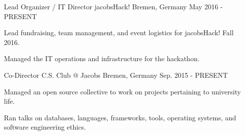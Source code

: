 

\begin{cventries}
  \cventry
    {Lead Organizer / IT Director} %
    {jacobsHack!} %
    {Bremen, Germany} %
    {May 2016 - PRESENT} %
    {
      \begin{cvitems} %
        \item {Lead fundraising, team management, and event logistics for jacobsHack! Fall 2016.}
        \item {Managed the IT operations and infrastructure for the hackathon.}
      \end{cvitems}
    }
  \cventry
    {Co-Director} %
    {C.S. Club @ Jacobs} %
    {Bremen, Germany} %
    {Sep. 2015 - PRESENT} %
    {
      \begin{cvitems} %
        \item {Managed an open source collective to work on projects pertaining to university life.}
        \item {Ran talks on databases, languages, frameworks, tools, operating systems, and software engineering ethics.}
      \end{cvitems}
    }
\end{cventries}
